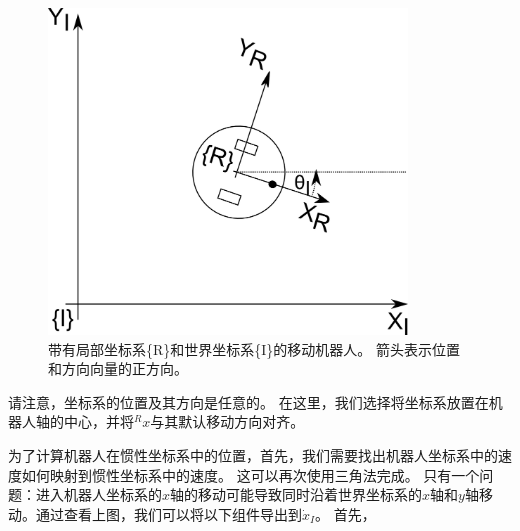 \begin{figure}[htb!]
	\centering
		\includegraphics[width=0.85\textwidth]{figs/mobilerobot.png}
	\caption{带有局部坐标系\{R\}和世界坐标系\{I\}的移动机器人。 箭头表示位置和方向向量的正方向。}
	\label{fig:mobilerobot}
\end{figure}


请注意，坐标系的位置及其方向是任意的。 在这里，我们选择将坐标系放置在机器人轴的中心，并将$^Rx$与其默认移动方向对齐。


为了计算机器人在惯性坐标系中的位置，首先，我们需要找出机器人坐标系中的速度如何映射到惯性坐标系中的速度。 这可以再次使用三角法完成。 只有一个问题：进入机器人坐标系的$x$轴的移动可能导致同时沿着世界坐标系的$x$轴和$y$轴移动。通过查看上图，我们可以将以下组件导出到$\dot{x}_I$。 首先，

